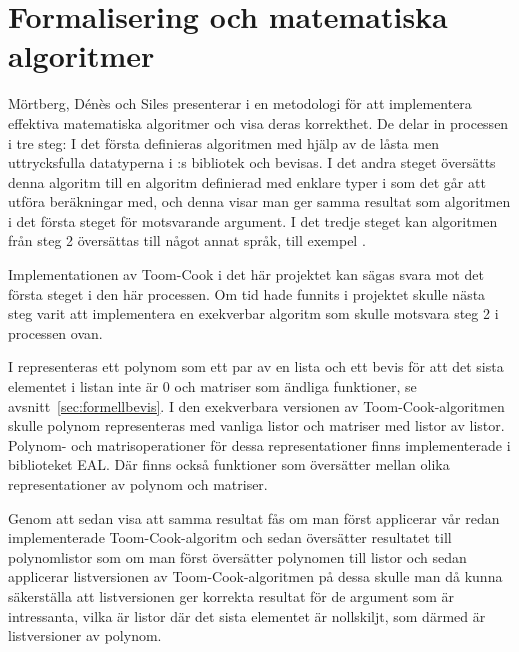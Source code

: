 \section{Formalisering och matematiska algoritmer}
\label{sec:exekverbar}
Mörtberg, Dénès och Siles presenterar i \cite{denes2012refinement} en metodologi för att
implementera effektiva matematiska algoritmer och visa deras korrekthet.
De delar in processen i tre steg: I det första definieras algoritmen med hjälp av de
låsta men uttrycksfulla datatyperna i \ssr{}:s bibliotek och bevisas. I det andra
steget översätts denna algoritm till en algoritm definierad med enklare typer i \ssr{}
som det går att utföra beräkningar med, och denna visar man ger samma resultat som
algoritmen i det första steget för motsvarande argument. I det tredje steget kan
algoritmen från steg 2 översättas till något annat språk, till exempel \haskell{}.

Implementationen av Toom-Cook i det här projektet kan sägas svara mot det
första steget i den här processen. Om tid hade funnits i projektet skulle nästa
steg varit att implementera en exekverbar algoritm som skulle motsvara steg 2 i
processen ovan.

I \ssr{} representeras ett polynom som ett par av en lista och ett bevis för
att det sista elementet i listan inte är 0 och matriser som ändliga funktioner,
se avsnitt~\ref{sec:formellbevis}. I den exekverbara versionen av
Toom-Cook-algoritmen skulle polynom representeras med vanliga listor och
matriser med listor av listor. Polynom- och matrisoperationer för dessa
representationer finns implementerade i biblioteket \coq{}EAL\cite{coqeal}. Där
finns också funktioner som översätter mellan olika representationer av polynom
och matriser.

Genom att sedan visa att samma resultat fås om man först applicerar vår redan
implementerade Toom-Cook-algoritm och sedan översätter resultatet till
polynomlistor som om man först översätter polynomen till listor och sedan
applicerar listversionen av Toom-Cook-algoritmen på dessa skulle man då kunna
säkerställa att listversionen ger korrekta resultat för de argument som är
intressanta, vilka är listor där det sista elementet är nollskiljt, som därmed
är listversioner av polynom.
